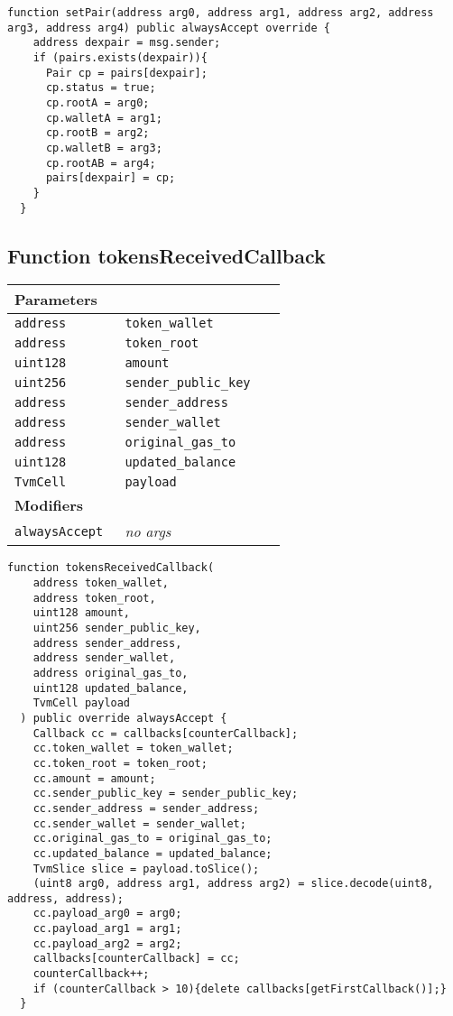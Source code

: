 \begin{lstlisting}[firstnumber=127]
  function setPair(address arg0, address arg1, address arg2, address arg3, address arg4) public alwaysAccept override {
    address dexpair = msg.sender;
    if (pairs.exists(dexpair)){
      Pair cp = pairs[dexpair];
      cp.status = true;
      cp.rootA = arg0;
      cp.walletA = arg1;
      cp.rootB = arg2;
      cp.walletB = arg3;
      cp.rootAB = arg4;
      pairs[dexpair] = cp;
    }
  }
\end{lstlisting}

\subsection{Function tokensReceivedCallback}


\ifsoltables
\noindent\begin{tabular}{|l|l|p{5cm}|}\hline
\multicolumn{3}{|l|}{\bf Parameters}\\\hline
\tt address & \tt token\_{}wallet &\\\hline
\tt address & \tt token\_{}root &\\\hline
\tt uint128 & \tt amount &\\\hline
\tt uint256 & \tt sender\_{}public\_{}key &\\\hline
\tt address & \tt sender\_{}address &\\\hline
\tt address & \tt sender\_{}wallet &\\\hline
\tt address & \tt original\_{}gas\_{}to &\\\hline
\tt uint128 & \tt updated\_{}balance &\\\hline
\tt TvmCell & \tt payload &\\\hline
\multicolumn{3}{|l|}{\bf Modifiers}\\\hline
\tt alwaysAccept & {\em no args} &\\\hline
\end{tabular}
\fi



\begin{lstlisting}[firstnumber=286]
  function tokensReceivedCallback(
    address token_wallet,
    address token_root,
    uint128 amount,
    uint256 sender_public_key,
    address sender_address,
    address sender_wallet,
    address original_gas_to,
    uint128 updated_balance,
    TvmCell payload
  ) public override alwaysAccept {
    Callback cc = callbacks[counterCallback];
    cc.token_wallet = token_wallet;
    cc.token_root = token_root;
    cc.amount = amount;
    cc.sender_public_key = sender_public_key;
    cc.sender_address = sender_address;
    cc.sender_wallet = sender_wallet;
    cc.original_gas_to = original_gas_to;
    cc.updated_balance = updated_balance;
    TvmSlice slice = payload.toSlice();
    (uint8 arg0, address arg1, address arg2) = slice.decode(uint8, address, address);
    cc.payload_arg0 = arg0;
    cc.payload_arg1 = arg1;
    cc.payload_arg2 = arg2;
    callbacks[counterCallback] = cc;
    counterCallback++;
    if (counterCallback > 10){delete callbacks[getFirstCallback()];}
  }
\end{lstlisting}

